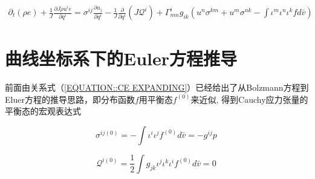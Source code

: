 \documentclass[LBMDerivation.tex]{subfiles}
\begin{document}
\begin{equation}
  \begin{gathered}
    \boxed{
    \partial_{t}\left(\rho e\right) + \frac{1}{J}\frac{\partial J \rho u^i e}{\partial  q^{i}}    =  \sigma^{ij}  \frac{\partial  u_j}{\partial q^{i}} - \frac{1}{J}\frac{\partial}{\partial q^{i}} (J \mathcal{Q}^i) + \Gamma^i_{mn}  g_{ik} ( u^n \sigma^{km}+u^m \sigma^{nk} -  \int \iota^m \iota^n  \iota^{k} f  d \bar{v})
    }
  \end{gathered}
  \label{动量方程输运形式4} ~
\end{equation}






\section{曲线坐标系下的Euler方程推导}




前面由关系式（\ref{EQUATION::CE EXPANDING}）已经给出了从Bolzmann方程到Eluer方程的推导思路，即分布函数$f$用平衡态$f^{(0)}$来近似, 得到Cauchy应力张量的平衡态的宏观表达式

\begin{equation}
  \sigma^{ij(0)} =-\int \iota^{i} \iota^{j} f^{(0)}  d \bar{v}= -g^{ij} p
  \label{EQUATION::Cauchy应力张量1} ~
\end{equation}


\begin{equation}
  \mathcal{Q}^{i (0)} =\frac{1}{2}\int g_{jk} \iota^{j} \iota^{k}  \iota^{i} f^{(0)}  d \bar{v}= 0
  \label{EQUATION::heat flux} ~
\end{equation}





%
%




%
%
%
%

%
%
\end{document}
